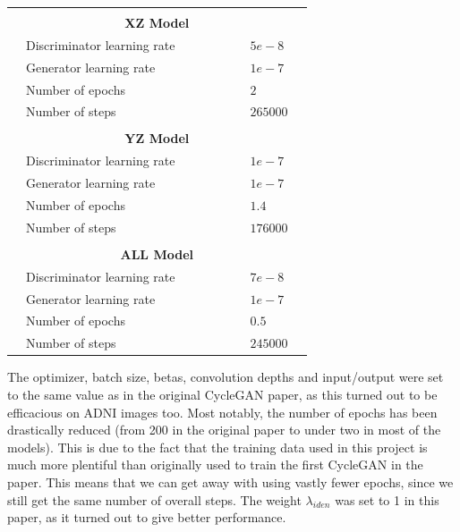 \documentclass[12pt, fleqn, titlepage]{article}
\newcommand{\1}[1]{\mathds{1}\left[#1\right]}
\begin{document}
\begin{table}[H]
\begin{tabular}{l l l l l l l l l}
		&                             &&&&& &               & \\
		& \multicolumn{7}{c}{\textbf{XZ Model}}             & \\
		& Discriminator learning rate &&&&& & $5e-8$        & \\
		& Generator learning rate     &&&&& & $1e-7$        & \\
		& Number of epochs            &&&&& & $2$           & \\
		& Number of steps             &&&&& & $265000$      & \\
		&                             &&&&& &               & \\
		& \multicolumn{7}{c}{\textbf{YZ Model}}             & \\
		& Discriminator learning rate &&&&& & $1e-7$        & \\
		& Generator learning rate     &&&&& & $1e-7$        & \\
		& Number of epochs            &&&&& & $1.4$         & \\
		& Number of steps             &&&&& & $176000$      & \\
		&                             &&&&& &               & \\
		& \multicolumn{7}{c}{\textbf{ALL Model}}            & \\
		& Discriminator learning rate &&&&& & $7e-8$        & \\
		& Generator learning rate     &&&&& & $1e-7$        & \\
		& Number of epochs            &&&&& & $0.5$         & \\		
		& Number of steps             &&&&& & $245000$      & \\
		\bottomrule
	\end{tabular}
\end{table} 
The optimizer, batch size, betas, convolution depths and input/output were set to the same value as in the original CycleGAN paper, as this turned out to be efficacious on ADNI images too. Most notably, the number of epochs has been drastically reduced (from 200 in the original paper to under two in most of the models). This is due to the fact that the training data used in this project is much more plentiful than originally used to train the first CycleGAN in the paper. This means that we can get away with using vastly fewer epochs, since we still get the same number of overall steps. The weight $\lambda_{iden}$ was set to 1 in this paper, as it turned out to give better performance.
\end{document}
